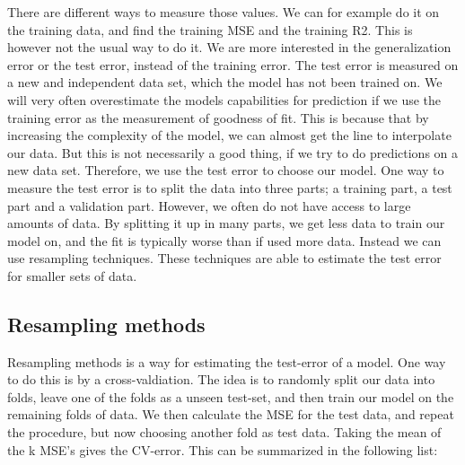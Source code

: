 There are different ways to measure those values. We can for example do it on the training data, and find the training MSE and the training R2. This is however not the usual way to do it. We are more interested in the generalization error or the test error, instead of the training error. The test error is measured on a new and independent data set, which the model has not been trained on. We will very often overestimate the models capabilities for prediction if we use the training error as the measurement of goodness of fit. This is because that by increasing the complexity of the model, we can almost get the line to interpolate our data. But this is not necessarily a good thing, if we try to do predictions on a new data set. Therefore, we use the test error to choose our model. One way to measure the test error is to split the data into three parts; a training part, a test part and a validation part. However, we often do not have access to large amounts of data. By splitting it up in many parts, we get less data to train our model on, and the fit is typically worse than if used more data. Instead we can use resampling techniques. These techniques are able to estimate the test error for smaller sets of data. 
\subsection{Resampling methods}
Resampling methods is a way for estimating the test-error of a model. One way to do this is by a  cross-valdiation. The idea is to randomly split our data into folds, leave one of the folds as a unseen test-set, and then train our model on the remaining folds of data.\cite{hastie} We then calculate the MSE for the test data, and repeat the procedure, but now choosing another fold as test data. Taking the mean of the k MSE's gives the CV-error. This can be summarized in the following list:

